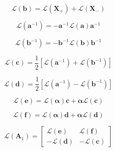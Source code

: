 \begin{equation}
\mathcal{L}(\mathbf{b}) = \mathcal{L}(\mathbf{X}_{+}) + \mathcal{L}(\mathbf{X}_{-})
\label{eq:mem-layer_quantities-homogeneous_solution-tangent_linear-b_l}
\end{equation}

\begin{equation}
\mathcal{L}(\mathbf{a}^{-1}) = -\mathbf{a}^{-1}\mathcal{L}(\mathbf{a})\mathbf{a}^{-1}
\label{eq:mem-layer_quantities-homogeneous_solution-tangent_linear-a_inv_l}
\end{equation}

\begin{equation}
\mathcal{L}(\mathbf{b}^{-1}) = -\mathbf{b}^{-1}\mathcal{L}(\mathbf{b})\mathbf{b}^{-1}
\label{eq:mem-layer_quantities-homogeneous_solution-tangent_linear-b_inv_l}
\end{equation}

\begin{equation}
\mathcal{L}(\mathbf{c}) = \frac{1}{2} \left[\mathcal{L}(\mathbf{a}^{-1}) + \mathcal{L}(\mathbf{b}^{-1})\right]
\label{eq:mem-layer_quantities-homogeneous_solution-tangent_linear-c_l}
\end{equation}

\begin{equation}
\mathcal{L}(\mathbf{d}) = \frac{1}{2} \left[\mathcal{L}(\mathbf{a}^{-1}) - \mathcal{L}(\mathbf{b}^{-1})\right]
\label{eq:mem-layer_quantities-homogeneous_solution-tangent_linear-d_l}
\end{equation}

\begin{equation}
\mathcal{L}(\mathbf{e}) = \mathcal{L}(\boldsymbol{\alpha})\mathbf{c} + \boldsymbol{\alpha}\mathcal{L}(\mathbf{c})
\label{eq:mem-layer_quantities-homogeneous_solution-tangent_linear-e_l}
\end{equation}

\begin{equation}
\mathcal{L}(\mathbf{f}) = \mathcal{L}(\boldsymbol{\alpha})\mathbf{d} + \boldsymbol{\alpha}\mathcal{L}(\mathbf{d})
\label{eq:mem-layer_quantities-homogeneous_solution-tangent_linear-f_l}
\end{equation}

\begin{equation}
\mathcal{L}(\mathbf{A}_{1}) =
\left[
\begin{array}{rr}
 \mathcal{L}(\mathbf{e}) &  \mathcal{L}(\mathbf{f}) \\
-\mathcal{L}(\mathbf{d}) & -\mathcal{L}(\mathbf{c})
\end{array}
\right]
\label{eq:mem-layer_quantities-homogeneous_solution-tangent_linear-A1_l}
\end{equation}

